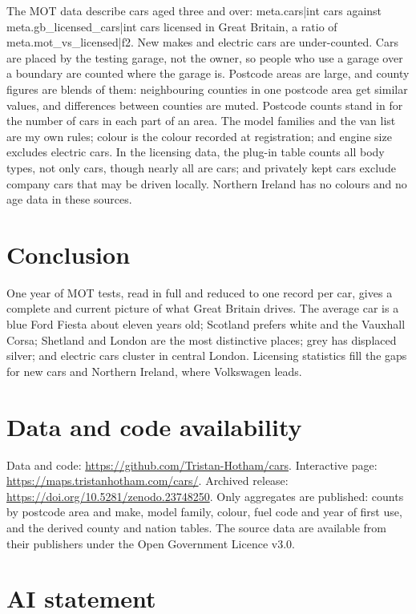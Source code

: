 \documentclass[11pt,a4paper]{article}
\begin{document}
The MOT data describe cars aged three and over: {{meta.cars|int}} cars against {{meta.gb_licensed_cars|int}} cars licensed in Great Britain, a ratio of {{meta.mot_vs_licensed|f2}}. New makes and electric cars are under-counted. Cars are placed by the testing garage, not the owner, so people who use a garage over a boundary are counted where the garage is. Postcode areas are large, and county figures are blends of them: neighbouring counties in one postcode area get similar values, and differences between counties are muted. Postcode counts stand in for the number of cars in each part of an area. The model families and the van list are my own rules; colour is the colour recorded at registration; and engine size excludes electric cars. In the licensing data, the plug-in table counts all body types, not only cars, though nearly all are cars; and privately kept cars exclude company cars that may be driven locally. Northern Ireland has no colours and no age data in these sources.

\section{Conclusion}

One year of MOT tests, read in full and reduced to one record per car, gives a complete and current picture of what Great Britain drives. The average car is a blue Ford Fiesta about eleven years old; Scotland prefers white and the Vauxhall Corsa; Shetland and London are the most distinctive places; grey has displaced silver; and electric cars cluster in central London. Licensing statistics fill the gaps for new cars and Northern Ireland, where Volkswagen leads.

\section*{Data and code availability}

Data and code: \url{https://github.com/Tristan-Hotham/cars}. Interactive page: \url{https://maps.tristanhotham.com/cars/}. Archived release: \url{https://doi.org/10.5281/zenodo.23748250}. Only aggregates are published: counts by postcode area and make, model family, colour, fuel code and year of first use, and the derived county and nation tables. The source data are available from their publishers under the Open Government Licence v3.0.

\section*{AI statement}
\end{document}
